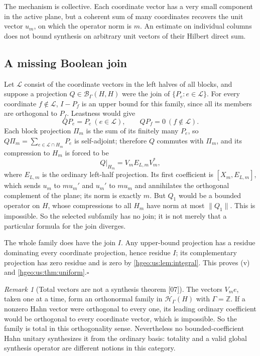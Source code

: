 \documentclass[11pt,letterpaper]{article}
\numberwithin{equation}{section}
\theoremstyle{definition}
\theoremstyle{remark}
\newtheorem{remark}[remark]{Remark}
\newcommand{\Z}{\mathbb Z}
\newcommand{\HH}[1]{\mathscr H_\Gamma(#1)}
\newcommand{\BH}{\mathscr B_\Gamma(H,H)}
\newcommand{\norm}[1]{\lVert #1\rVert}
\newcommand{\src}[1]{\textup{\textsf{\small[#1]}}}
\begin{document}
The mechanism is collective. Each coordinate vector has a very small
component in the active plane, but a coherent sum of many coordinates recovers
the unit vector $u_m$, on which the operator norm is $m$. An estimate on
individual columns does not bound synthesis on arbitrary unit vectors of their
Hilbert direct sum.

\subsection{A missing Boolean join}
Let $\mathcal L$ consist of the coordinate vectors in the left halves of all
blocks, and suppose a projection $Q\in\BH$ were the join of
$\{P_e:e\in\mathcal L\}$. For every coordinate $f\notin\mathcal L$, $I-P_f$ is
an upper bound for this family, since all its members are orthogonal to
$P_f$. Leastness would give
\[
 QP_e=P_e\ (e\in\mathcal L),\qquad QP_f=0\ (f\notin\mathcal L).
\]
Each block projection $\Pi_m$ is the sum of its finitely many $P_e$, so
$Q\Pi_m=\sum_{e\in\mathcal L\cap H_m}P_e$ is self-adjoint; therefore $Q$
commutes with $\Pi_m$, and its compression to $H_m$ is forced to be
\[
 Q|_{H_m}=V_mE_{L,m}V_m^* ,
\]
where $E_{L,m}$ is the ordinary left-half projection. Its first coefficient is
$[X_m,E_{L,m}]$, which sends $u_m$ to $mu_m'$ and $u_m'$ to $mu_m$ and
annihilates the orthogonal complement of the plane; its norm is exactly $m$.
But $Q_1$ would be a bounded operator on $H$, whose compressions to all $H_m$
have norm at most $\norm{Q_1}$. This is impossible. So the selected subfamily
has no join; it is not merely that a particular formula for the join
diverges.

The whole family does have the join $I$. Any upper-bound projection has a
residue dominating every coordinate projection, hence residue $I$; its
complementary projection has zero residue and is zero by
\cref{hgeo:us:lem:integral}. This proves (v) and
\cref{hgeo:us:thm:uniform}.\hfill$\square$

\begin{remark}[Total vectors are not a synthesis theorem \src{07}]
\label{hgeo:us:rem:total}
The vectors $V_me$, taken one at a time, form an orthonormal family in
$\HH{H}$ with $\Gamma=\Z$. If a nonzero Hahn vector were orthogonal to every one,
its leading ordinary coefficient would be orthogonal to every coordinate
vector, which is impossible. So the family is total in this orthogonality
sense. Nevertheless no bounded-coefficient Hahn unitary synthesizes it from
the ordinary basis: totality and a valid global synthesis operator are
different notions in this category.
\end{remark}
\end{document}

